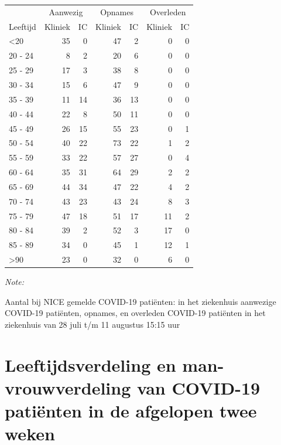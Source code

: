 \documentclass[
  english,
  man,floatsintext]{apa6}
\begin{document}
\begin{table}
\centering\begingroup\fontsize{10}{12}\selectfont

\begin{threeparttable}
\begin{tabular}{lrrrrrr}
\toprule
\multicolumn{1}{c}{ } & \multicolumn{2}{c}{Aanwezig} & \multicolumn{2}{c}{Opnames} & \multicolumn{2}{c}{Overleden} \\
\cmidrule(l{3pt}r{3pt}){2-3} \cmidrule(l{3pt}r{3pt}){4-5} \cmidrule(l{3pt}r{3pt}){6-7}
Leeftijd & Kliniek & IC & Kliniek & IC & Kliniek & IC\\
\midrule
<20 & 35 & 0 & 47 & 2 & 0 & 0\\
20 - 24 & 8 & 2 & 20 & 6 & 0 & 0\\
25 - 29 & 17 & 3 & 38 & 8 & 0 & 0\\
30 - 34 & 15 & 6 & 47 & 9 & 0 & 0\\
35 - 39 & 11 & 14 & 36 & 13 & 0 & 0\\
40 - 44 & 22 & 8 & 50 & 11 & 0 & 0\\
45 - 49 & 26 & 15 & 55 & 23 & 0 & 1\\
50 - 54 & 40 & 22 & 73 & 22 & 1 & 2\\
55 - 59 & 33 & 22 & 57 & 27 & 0 & 4\\
60 - 64 & 35 & 31 & 64 & 29 & 2 & 2\\
65 - 69 & 44 & 34 & 47 & 22 & 4 & 2\\
70 - 74 & 43 & 23 & 43 & 24 & 8 & 3\\
75 - 79 & 47 & 18 & 51 & 17 & 11 & 2\\
80 - 84 & 39 & 2 & 52 & 3 & 17 & 0\\
85 - 89 & 34 & 0 & 45 & 1 & 12 & 1\\
>90 & 23 & 0 & 32 & 0 & 6 & 0\\
\bottomrule
\end{tabular}
\begin{tablenotes}
\item \textit{Note: } 
\item Aantal bij NICE gemelde COVID-19 patiënten: in het ziekenhuis aanwezige COVID-19 patiënten, opnames, en overleden COVID-19 patiënten in het ziekenhuis van 28 juli t/m 11 augustus 15:15 uur
\end{tablenotes}
\end{threeparttable}
\endgroup{}
\end{table}

\newpage

\hypertarget{leeftijdsverdeling-en-man-vrouwverdeling-van-covid-19-patiuxebnten-in-de-afgelopen-twee-weken}{%
\section{Leeftijdsverdeling en man-vrouwverdeling van COVID-19 patiënten in de afgelopen twee weken}\label{leeftijdsverdeling-en-man-vrouwverdeling-van-covid-19-patiuxebnten-in-de-afgelopen-twee-weken}}
\end{document}
